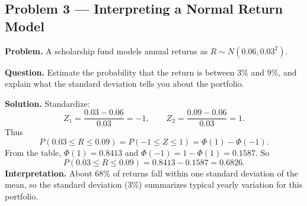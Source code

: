 \begin{ExamProblems}
		
		\hypertarget{c8-ex3}{}
		\item
		\subsection*{Problem 3 — Interpreting a Normal Return Model}
		
		\textbf{Problem.}
		A scholarship fund models annual returns as \(R\sim N(0.06,0.03^2)\).
		
		\textbf{Question.} Estimate the probability that the return is between 3\% and 9\%, and explain
		what the standard deviation tells you about the portfolio.
		
		\textbf{Solution.}
		Standardize:
		\[
		Z_1=\frac{0.03-0.06}{0.03}=-1,\qquad Z_2=\frac{0.09-0.06}{0.03}=1.
		\]
		Thus
		\[
		P(0.03\le R\le 0.09)=P(-1\le Z\le 1)=\Phi(1)-\Phi(-1).
		\]
		From the table, \(\Phi(1)=0.8413\) and \(\Phi(-1)=1-\Phi(1)=0.1587\).
		So
		\[
		P(0.03\le R\le 0.09)=0.8413-0.1587=0.6826.
		\]
		\textbf{Interpretation.} About 68\% of returns fall within one standard deviation of the mean,
		so the standard deviation (3\%) summarizes typical yearly variation for this portfolio.
		
	\end{ExamProblems}
	
	
